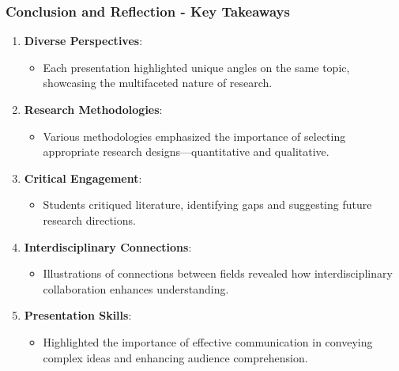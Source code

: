 \documentclass[aspectratio=169]{beamer}
\begin{document}
\begin{frame}[fragile]
    \frametitle{Conclusion and Reflection - Key Takeaways}
    
    \begin{enumerate}
        \item \textbf{Diverse Perspectives}:
        \begin{itemize}
            \item Each presentation highlighted unique angles on the same topic, showcasing the multifaceted nature of research.
        \end{itemize}
        
        \item \textbf{Research Methodologies}:
        \begin{itemize}
            \item Various methodologies emphasized the importance of selecting appropriate research designs—quantitative and qualitative.
        \end{itemize}
        
        \item \textbf{Critical Engagement}:
        \begin{itemize}
            \item Students critiqued literature, identifying gaps and suggesting future research directions.
        \end{itemize}
        
        \item \textbf{Interdisciplinary Connections}:
        \begin{itemize}
            \item Illustrations of connections between fields revealed how interdisciplinary collaboration enhances understanding.
        \end{itemize}
        
        \item \textbf{Presentation Skills}:
        \begin{itemize}
            \item Highlighted the importance of effective communication in conveying complex ideas and enhancing audience comprehension.
        \end{itemize}
    \end{enumerate}
\end{frame}
\end{document}
